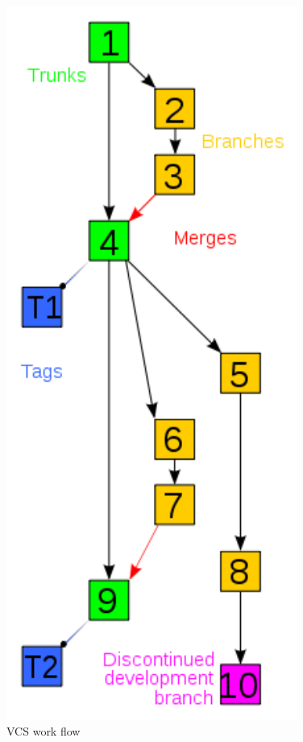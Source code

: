 \documentclass[11pt,ignorenonframetext,]{beamer}
\begin{document}
\begin{frame}
\begin{columns}
  \begin{column}{0.3\textwidth}
 \begin{figure}[htbp]
\centering
\includegraphics[width=0.85\textwidth]{figures/vcsflow.png}
\caption{VCS work flow}
\end{figure}
  \end{column}
\end{columns}
\bigskip

\end{frame}
\end{document}
